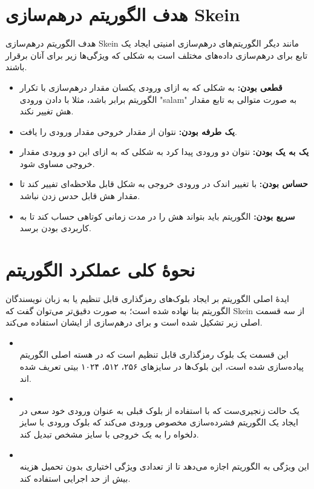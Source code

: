 \section{هدف الگوریتم درهم‌سازی Skein}	
هدف الگوریتم درهم‌سازی Skein مانند دیگر الگوریتم‌های درهم‌سازی امنیتی ایجاد یک تابع برای درهم‌سازی داده‌های مختلف است به شکلی که ویژگی‌ها زیر برای آنان برقرار باشند.

\begin{itemize}
	\item \textbf{قطعی بودن:}
	      به شکلی که به ازای ورودی یکسان مقدار در‌هم‌سازی با تکرار الگوریتم برابر باشد، مثلا با دادن ورودی "salam" به صورت متوالی به تابع مقدار هش تغییر نکند. 
	\item \textbf{یک طرفه بودن:}
	      نتوان از مقدار خروحی مقدار ورودی را یافت. 
	\item
	      \textbf{یک به یک بودن:
	      }نتوان دو ورودی پیدا کرد به شکلی که به ازای این دو ورودی مقدار خروجی مساوی شود.
	\item \textbf{حساس بودن:}
	      با تغییر اندک در ورودی خروجی به شکل قابل ملاحظه‌ای تفییر کند تا مقدار هش قابل حدس زدن نباشد.
	\item
	      \textbf{سریع بودن:} 
	      الگوریتم باید بتواند هش را در مدت زمانی کوتاهی حساب کند تا به کاربردی بودن برسد.
	      
\end{itemize}

\pagebreak
\section{نحوهٔ کلی عملکرد الگوریتم}
ایدهٔ اصلی الگوریتم بر ایجاد بلوک‌های رمزگذاری قابل تنظیم یا به زبان نویسندگان الگوریتم
بنا نهاده شده است؛ به صورت دقیق‌تر می‌توان گفت که
Skein 
از سه قسمت اصلی زیر تشکیل شده است و برای درهم‌سازی از ایشان استفاده می‌کند.
\begin{itemize}
	\item
	      \\
	      این قسمت یک بلوک رمزگذاری قابل تنظیم است که در هسته اصلی الگوریتم پیاده‌سازی شده است، این بلوک‌ها در سایزهای ۲۵۶، ۵۱۲، ۱۰۲۴ بیتی تعریف شده اند.
	\item
	      \\
	      یک حالت زنجیری‌ست که با استفاده از بلوک قبلی به عنوان ورودی خود سعی در ایجاد یک الگوریتم فشرده‌سازی مخصوص ورودی می‌کند که بلوک ورودی با سایز دلخواه را به یک خروجی با سایز مشخص تبدیل کند.
	\item
	      \\
	      این ویژگی به الگوریتم اجازه می‌دهد تا از تعدادی ویژگی اختیاری بدون تحمیل هزینه بیش از حد اجرایی استفاده کند. 
	      \cite{main_doc}
\end{itemize}

